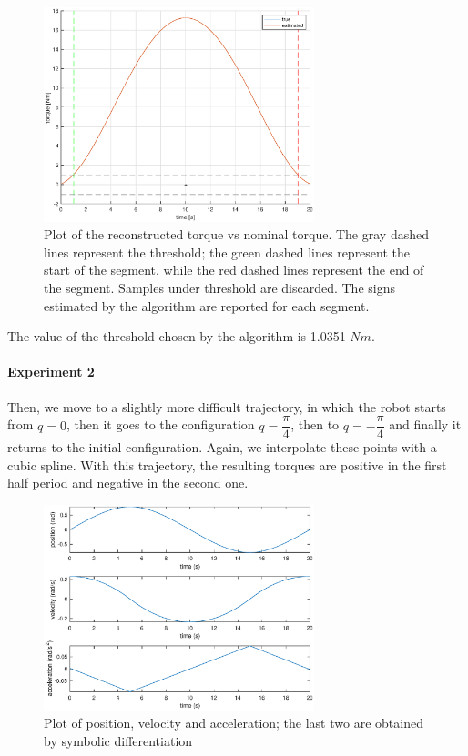 \documentclass{article}
\begin{document}
\begin{figure}[!htbp]
\centering
\includegraphics[width=0.7\textwidth]{images/1-dof/results1.eps}
\caption{Plot of the reconstructed torque vs nominal torque. The gray dashed lines represent the threshold; the green dashed lines represent the start of the segment, while the red dashed lines represent the end of the segment. Samples under threshold are discarded. The signs estimated by the algorithm are reported for each segment.}
\end{figure}
\FloatBarrier

The value of the threshold chosen by the algorithm is 1.0351 $Nm$.

\paragraph{Experiment 2}Then, we move to a slightly more difficult trajectory, in which the robot starts from $q = 0$, then it goes to the configuration $q = \dfrac{\pi}{4}$, then to $q = -\dfrac{\pi}{4}$ and finally it returns to the initial configuration. Again, we interpolate these points with a cubic spline. With this trajectory, the resulting torques are positive in the first half period and negative in the second one.

\begin{figure}[!htbp]
\centering
\includegraphics[width=0.7\textwidth]{images/1-dof/trajectory_easy2.eps}
\caption{Plot of position, velocity and acceleration; the last two are obtained by symbolic differentiation}
\end{figure}
\FloatBarrier
\end{document}

